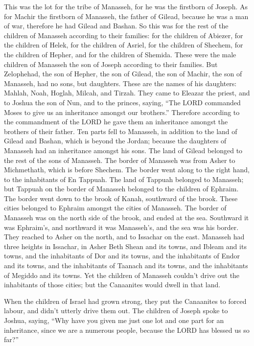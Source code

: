  This was the lot for the tribe of Manasseh, for he was
the firstborn of Joseph. As for Machir the firstborn of Manasseh, the
father of Gilead, because he was a man of war, therefore he had Gilead
and Bashan.  So this was for the rest of the children of
Manasseh according to their families: for the children of Abiezer, for
the children of Helek, for the children of Asriel, for the children of
Shechem, for the children of Hepher, and for the children of Shemida.
These were the male children of Manasseh the son of Joseph according to
their families.  But Zelophehad, the son of Hepher, the
son of Gilead, the son of Machir, the son of Manasseh, had no sons, but
daughters. These are the names of his daughters: Mahlah, Noah, Hoglah,
Milcah, and Tirzah.  They came to Eleazar the priest, and
to Joshua the son of Nun, and to the princes, saying, ``The LORD
commanded Moses to give us an inheritance amongst our brothers.''
Therefore according to the commandment of the LORD he gave them an
inheritance amongst the brothers of their father.  Ten
parts fell to Manasseh, in addition to the land of Gilead and Bashan,
which is beyond the Jordan;  because the daughters of
Manasseh had an inheritance amongst his sons. The land of Gilead
belonged to the rest of the sons of Manasseh.  The border
of Manasseh was from Asher to Michmethath, which is before Shechem. The
border went along to the right hand, to the inhabitants of En Tappuah.
 The land of Tappuah belonged to Manasseh; but Tappuah on
the border of Manasseh belonged to the children of Ephraim.
 The border went down to the brook of Kanah, southward of
the brook. These cities belonged to Ephraim amongst the cities of
Manasseh. The border of Manasseh was on the north side of the brook, and
ended at the sea.  Southward it was Ephraim's, and
northward it was Manasseh's, and the sea was his border. They reached to
Asher on the north, and to Issachar on the east. 
Manasseh had three heights in Issachar, in Asher Beth Shean and its
towns, and Ibleam and its towns, and the inhabitants of Dor and its
towns, and the inhabitants of Endor and its towns, and the inhabitants
of Taanach and its towns, and the inhabitants of Megiddo and its towns.
 Yet the children of Manasseh couldn't drive out the
inhabitants of those cities; but the Canaanites would dwell in that
land.

 When the children of Israel had grown strong, they put
the Canaanites to forced labour, and didn't utterly drive them out.
 The children of Joseph spoke to Joshua, saying, ``Why
have you given me just one lot and one part for an inheritance, since we
are a numerous people, because the LORD has blessed us so far?''


